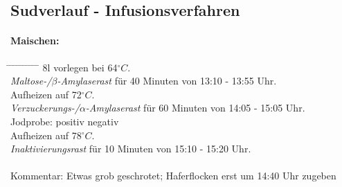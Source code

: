 \documentclass[12pt,oneside,a4paper]{scrartcl}
\begin{document}
\subsection*{Sudverlauf - Infusionsverfahren}	
%
\paragraph{Maischen:}
	\begin{tabbing}\hspace{1cm} \=
		\hspace{1cm} \= \hspace{1cm} \=\hspace{1cm} \=\hspace{1cm} \=\hspace{1cm} \= \hspace{1cm} \= \hspace{1cm} \= \hspace{1cm} \= \hspace{1cm} \= \kill
		\> 8l vorlegen bei 64$^\circ C$.\\
		\> \textit{Maltose-/$\beta$-Amylaserast} für 40 Minuten von 13:10 - 13:55 Uhr.\\
		\> \> Aufheizen auf 72$^\circ C$.\\
		\> \textit{Verzuckerungs-/$\alpha$-Amylaserast} für 60 Minuten von 14:05 - 15:05 Uhr.\\
		\> \> \> Jodprobe: \> \> \Square positiv \> \> \CheckedBox negativ\\
		\> \> Aufheizen auf 78$^\circ C$.\\
		\> \textit{Inaktivierungsrast} für 10 Minuten von 15:10 - 15:20 Uhr.\\\\
		\> Kommentar: \>\>\> Etwas grob geschrotet; Haferflocken erst um 14:40 Uhr zugeben
	\end{tabbing}
	\begin{center}
		\end{center}
%
\end{document}
